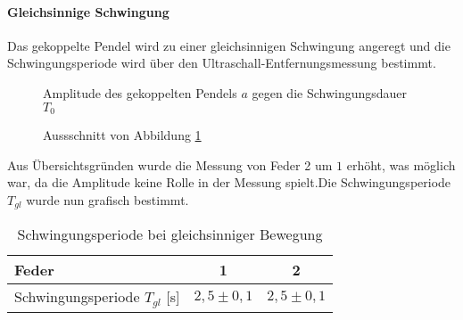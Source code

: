 \paragraph{Gleichsinnige Schwingung}
Das gekoppelte Pendel wird zu einer gleichsinnigen Schwingung angeregt und die Schwingungsperiode wird über den Ultraschall-Entfernungsmessung bestimmt.
\begin{figure}[H]
  \centering
  \caption{Amplitude des gekoppelten Pendels $a$ gegen die Schwingungsdauer $T_0$ }
  \label{fig:gleichschwingung}
\end{figure}
\begin{figure}[H]
  \centering
  \caption{Aussschnitt von Abbildung \ref{fig:gleichschwingung} }
  \label{fig:ausschnittgleich}
\end{figure}
Aus Übersichtsgründen wurde die Messung von Feder 2 um $1$ erhöht, was möglich war, da die Amplitude keine Rolle in der Messung spielt.Die Schwingungsperiode $T_{gl}$ wurde nun grafisch bestimmt.
\begin{table}[H]
  \centering
  \begin{tabular}{l | c | c }
    Feder & 1 & 2\\ \hline
    Schwingungsperiode $T_{gl}$ [s]& $2,5\pm 0,1$ & $2,5 \pm 0,1$
    
  \end{tabular}
  \caption{Schwingungsperiode bei gleichsinniger Bewegung}
  \label{tab:tgleich}
\end{table}
